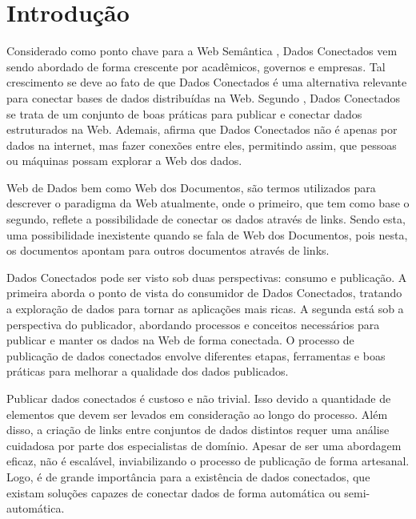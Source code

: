 \chapter{Introdução}
\label{cap:introducao}
Considerado como ponto chave para a Web Semântica \cite{berners2001semantic}, Dados Conectados vem sendo abordado de forma crescente por acadêmicos, governos e empresas. Tal crescimento se deve ao fato de que Dados Conectados é uma alternativa relevante para conectar bases de dados distribuídas na Web. Segundo , Dados Conectados se trata de um conjunto de boas práticas para publicar e conectar dados estruturados na Web. Ademais,  afirma que Dados Conectados não é apenas por dados na internet, mas fazer conexões entre eles, permitindo assim, que pessoas ou máquinas possam explorar a Web dos dados.

Web de Dados bem como Web dos Documentos, são termos utilizados para descrever o paradigma da Web atualmente, onde o primeiro, que tem como base o segundo, reflete a possibilidade de conectar os dados através de links. Sendo esta, uma possibilidade inexistente quando se fala de Web dos Documentos, pois nesta, os documentos apontam para outros documentos através de links.

Dados Conectados pode ser visto sob duas perspectivas: consumo e publicação. A primeira aborda o ponto de vista do consumidor de Dados Conectados, tratando a exploração de dados para tornar as aplicações mais ricas. A segunda está sob a perspectiva do publicador, abordando processos \cite{bizer2007publish, hyland2011joy, villazon2011methodological, Avila2015} e conceitos \cite{berners2006linked, wood2014linked} necessários para publicar e manter os dados na Web de forma conectada. O processo de publicação de dados conectados envolve diferentes etapas, ferramentas e boas práticas \cite{world2014best} para melhorar a qualidade dos dados publicados. 

Publicar dados conectados é custoso e não trivial. Isso devido a quantidade de elementos que devem ser levados em consideração ao longo do processo. Além disso, a criação de links entre conjuntos de dados distintos requer uma análise cuidadosa por parte dos especialistas de domínio. Apesar de ser uma abordagem eficaz, não é escalável, inviabilizando o processo de publicação de forma artesanal. Logo, é de grande importância para a existência de dados conectados, que existam soluções capazes de conectar dados de forma automática ou semi-automática. 


